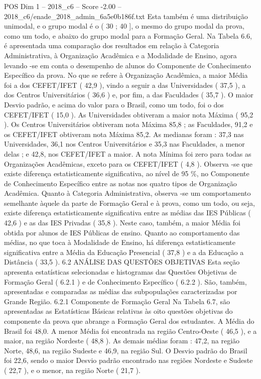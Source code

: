 \begin{textsample}{POS Dim 1 – 2018\_c6 – Score -2.00 – 2018\_c6/enade\_2018\_admin\_6a5e0b186f.txt}
Esta também é uma distribuição unimodal, e o grupo modal é o ( 30 ; 40 ], o mesmo do grupo modal da prova, como um todo, e abaixo do grupo modal para a Formação Geral.
Na Tabela 6.6, é apresentada uma comparação dos resultados em relação à Categoria Administrativa, à Organização Acadêmica e a Modalidade de Ensino, agora levando -se em conta o desempenho de alunos do Componente de Conhecimento Específico da prova.
No que se refere à Organização Acadêmica, a maior Média foi a dos CEFET/IFET ( 42,9 ), vindo a seguir a das Universidades ( 37,5 ), a dos Centros Universitários ( 36,6 ) e, por fim, a das Faculdades ( 35,7 ).
O maior Desvio padrão, e acima do valor para o Brasil, como um todo, foi o dos CEFET/IFET ( 15,0 ).
As Universidades obtiveram a maior nota Máxima ( 95,2 ).
Os Centros Universitários obtiveram nota Máxima 85,8 ; as Faculdades, 91,2 e os CEFET/IFET obtiveram nota Máxima 85,2.
As medianas foram : 37,3 nas Universidades, 36,1 nos Centros Universitários e 35,3 nas Faculdades, a menor delas ; e 42,8, nos CEFET/IFET a maior.
A nota Mínima foi zero para todas as Organizações Acadêmicas, exceto para os CEFET/IFET ( 4,8 ).
Observa -se que existe diferença estatisticamente significativa, ao nível de 95 \%, no Componente de Conhecimento Específico entre as notas nos quatro tipos de Organização Acadêmica.
Quanto à Categoria Administrativa, observa -se um comportamento semelhante àquele da parte de Formação Geral e à prova, como um todo, ou seja, existe diferença estatisticamente significativa entre as médias das IES Públicas ( 42,6 ) e as das IES Privadas ( 35,8 ).
Neste caso, também, a maior Média foi obtida por alunos de IES Públicas de ensino.
Quanto ao comportamento das médias, no que toca à Modalidade de Ensino, há diferença estatisticamente significativa entre a Média da Educação Presencial ( 37,8 ) e a da Educação a Distância ( 33,5 ). 6.2 ANÁLISE DAS QUESTÕES OBJETIVAS Esta seção apresenta estatísticas selecionadas e histogramas das Questões Objetivas de Formação Geral ( 6.2.1 ) e de Conhecimento Específico ( 6.2.2 ).
São, também, apresentadas e comparadas as médias das subpopulações caracterizadas por Grande Região. 6.2.1 Componente de Formação Geral Na Tabela 6.7, são apresentadas as Estatísticas Básicas relativas às oito questões objetivas do componente da prova que abrange a Formação Geral dos estudantes.
A Média do Brasil foi 48,0.
A menor Média foi encontrada na região Centro-Oeste ( 46,5 ), e a maior, na região Nordeste ( 48,8 ).
As demais médias foram : 47,2, na região Norte, 48,6, na região Sudeste e 46,9, na região Sul.
O Desvio padrão do Brasil foi 22,6, sendo o maior Desvio padrão encontrado nas regiões Nordeste e Sudeste ( 22,7 ), e o menor, na região Norte ( 21,7 ).

\end{textsample}
